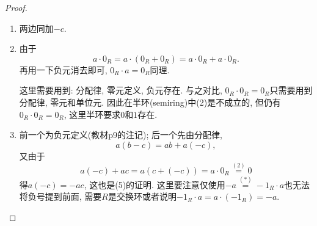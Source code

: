 \begin{proof}
    \begin{enumerate}[(1)]
        \item 两边同加$-c$.
        \item 由于
        \[
            a \cdot 0_R = a \cdot (0_R + 0_R) = a \cdot 0_R + a \cdot 0_R.
        \]
        再用一下负元消去即可, $0_R \cdot a = 0_R$同理.

        \begin{remark}
            这里需要用到: 分配律, 零元定义, 负元存在. 与之对比, $0_R \cdot 0_R = 0_R$只需要用到分配律, 零元和单位元. 因此在半环(semiring)中(2)是不成立的, 但仍有$0_R \cdot 0_R = 0_R$, 这里半环要求$0$和$1$存在.
        \end{remark}

        \item 前一个为负元定义(教材p9的注记); 后一个先由分配律,
        \[
            a(b - c) = ab + a(-c),
        \]
        又由于
        \[
            a(-c) + ac = a(c + (-c)) = a \cdot 0_R \overset{(2)}= 0
        \]
        得$a(-c) = -ac$, 这也是(5)的证明. 这里要注意仅使用$-a \overset{(*)}= -1_R \cdot a$也无法将负号提到前面, 需要$R$是交换环或者说明$-1_R \cdot a = a \cdot (-1_R) = -a$.


\end{enumerate}
\end{proof}
